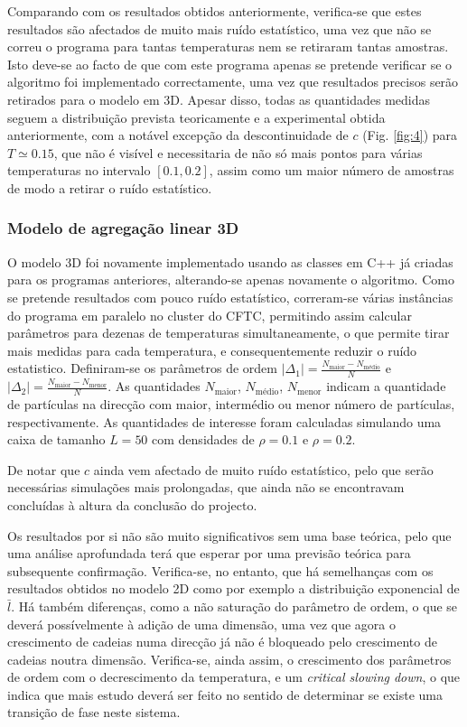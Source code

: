 \documentclass[a4paper,10pt]{article}
\begin{document}
\begin{multicols}{2}
Comparando com os resultados obtidos anteriormente\cite{tavares}, verifica-se que estes resultados são afectados de muito mais ruído estatístico, uma vez que não se correu o programa para tantas temperaturas nem se retiraram tantas amostras. Isto deve-se ao facto de que com este programa apenas se pretende verificar se o algoritmo foi implementado correctamente, uma vez que resultados precisos serão retirados para o modelo em 3D. Apesar disso, todas as quantidades medidas seguem a distribuição prevista teoricamente e a experimental obtida anteriormente, com a notável excepção da descontinuidade de $c$ (Fig. \ref{fig:4}) para $T\simeq 0.15$, que não é visível e necessitaria de não só mais pontos para várias temperaturas no intervalo $[0.1,0.2]$, assim como um maior número de amostras de modo a retirar o ruído estatístico.

\subsubsection{Modelo de agregação linear 3D}

O modelo 3D foi novamente implementado usando as classes em C++ já criadas para os programas anteriores, alterando-se apenas novamente o algoritmo. Como se pretende resultados com pouco ruído estatístico, correram-se várias instâncias do programa em paralelo no cluster do CFTC\cite{grace}, permitindo assim calcular parâmetros para dezenas de temperaturas simultaneamente, o que permite tirar mais medidas para cada temperatura, e consequentemente reduzir o ruído estatistico. Definiram-se os parâmetros de ordem $|\Delta_1| = \frac{N_\text{maior} - N_\text{médio}}{N}$ e $|\Delta_2| = \frac{N_\text{maior} - N_\text{menor}}{N}$. As quantidades $N_\text{maior}$, $N_\text{médio}$, $N_\text{menor}$ indicam a quantidade de partículas na direcção com maior, intermédio ou menor número de partículas, respectivamente. As quantidades de interesse foram calculadas simulando uma caixa de tamanho $L=50$ com densidades de $\rho = 0.1$ e $\rho = 0.2$.

De notar que $c$ ainda vem afectado de muito ruído estatístico, pelo que serão necessárias simulações mais prolongadas, que ainda não se encontravam concluídas à altura da conclusão do projecto.

Os resultados por si não são muito significativos sem uma base teórica, pelo que uma análise aprofundada terá que esperar por uma previsão teórica para subsequente confirmação. Verifica-se, no entanto, que há semelhanças com os resultados obtidos no modelo 2D como por exemplo a distribuição exponencial de $\bar{l}$. Há também diferenças, como a não saturação do parâmetro de ordem, o que se deverá possívelmente à adição de uma dimensão, uma vez que agora o crescimento de cadeias numa direcção já não é bloqueado pelo crescimento de cadeias noutra dimensão. Verifica-se, ainda assim, o crescimento dos parâmetros de ordem com o decrescimento da temperatura, e um \textit{critical slowing down}, o que indica que mais estudo deverá ser feito no sentido de determinar se existe uma transição de fase neste sistema.


\end{multicols}
\end{document}
